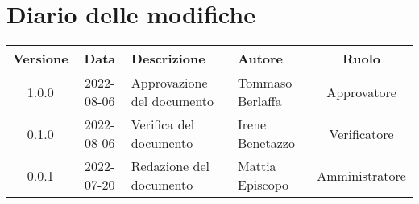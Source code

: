 \section*{Diario delle modifiche}
	\begin{center}
	\renewcommand{\arraystretch}{1.8} %
	\begin{tabular}{ |c|c|m{12em}|m{7em}|c| }
	\hline
	\textbf{Versione} & \textbf{Data} & \textbf{Descrizione} &  \textbf{Autore} &  \textbf{Ruolo} \\ %
	\hline
	1.0.0 & 2022-08-06  & Approvazione del documento & Tommaso Berlaffa & Approvatore\\
	\hline
	0.1.0 & 2022-08-06 & Verifica del documento & Irene \newline Benetazzo & Verificatore\\
	\hline
   	0.0.1 & 2022-07-20 & Redazione del documento & Mattia \newline Episcopo & Amministratore\\ %
	\hline
	\end{tabular}
	\end{center}
	\newpage